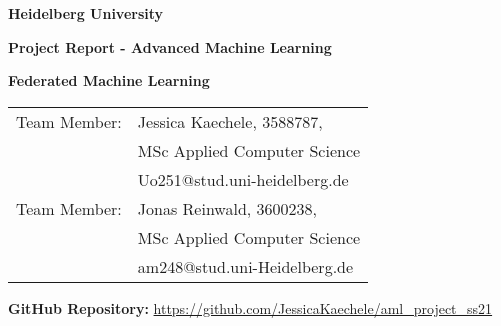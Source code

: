 \documentclass[
     12pt,         %
     a4paper,      %
     BCOR10mm,     %
     DIV14,        %
     ]{article}
\begin{document}
\begin{titlepage}


\begin{center}
\textbf{ 
\Large Heidelberg University\\
\smallskip
}

\vspace{2cm}

\textbf{\large Project Report - Advanced Machine Learning}

\vspace{0.5\baselineskip}
{\huge
\textbf{Federated Machine Learning}
}
\end{center}

\vfill 

{\large
\begin{tabular}[l]{ll}
Team Member: & Jessica Kaechele, 3588787,\\ & MSc Applied Computer Science\\
  & Uo251@stud.uni-heidelberg.de\\
Team Member: & Jonas Reinwald, 3600238, \\ & MSc Applied Computer Science\\
  & am248@stud.uni-Heidelberg.de\\
\end{tabular}
}
\vspace*{2cm}

{
  \begin{center}
  \textbf{GitHub Repository:}
  \url{https://github.com/JessicaKaechele/aml_project_ss21}
  \end{center}
}

\vspace*{.5cm}

\end{titlepage} 

% 
\newpage
\tableofcontents

\newpage
\listoffigures
\listoftables

\newpage

\end{document}
